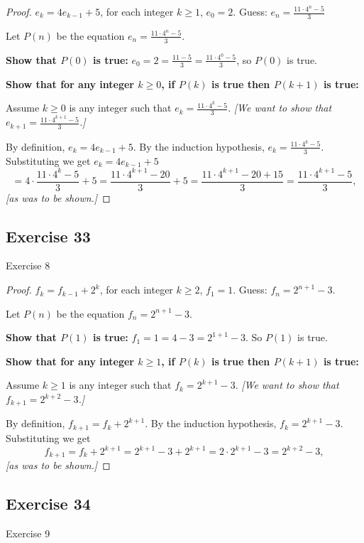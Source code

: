 \documentclass[14pt]{extarticle}
\newcommand{\dps}{\displaystyle}
\begin{document}
\begin{proof}
\(e_k = 4e_{k-1} + 5\), for each integer \(k \geq 1\), \(e_0 = 2\). 
Guess: \(\dps e_n = \frac{11 \cdot 4^n - 5}{3}\)

Let $P(n)$ be the equation \(\dps e_n = \frac{11 \cdot 4^n - 5}{3}\).

{\bf Show that \(P(0)\) is true:} \(e_0 = 2 = \frac{11 - 5}{3} = \frac{11 \cdot 4^0 - 5}{3}\), so $P(0)$ is true.

{\bf Show that for any integer \(k \geq 0\), if \(P(k)\) is true then \(P(k+1)\) is true:}

Assume \(k \geq 0\) is any integer such that \(\dps e_k = \frac{11 \cdot 4^k - 5}{3}\). 
{\it [We want to show that \(\dps e_{k+1} = \frac{11 \cdot 4^{k+1} - 5}{3}\).]}

By definition, \(e_k = 4e_{k-1} + 5\).
By the induction hypothesis, \(\dps e_k = \frac{11 \cdot 4^k - 5}{3}\).
Substituting we get \(e_k = 4e_{k-1} + 5\)
\[
= 4 \cdot \frac{11 \cdot 4^k - 5}{3} + 5 = \frac{11 \cdot 4^{k+1} - 20}{3} + 5 = 
\frac{11 \cdot 4^{k+1} - 20 + 15}{3} = \frac{11 \cdot 4^{k+1} - 5}{3},
\]
{\it [as was to be shown.]}
\end{proof}

\subsection{Exercise 33}
Exercise 8

\begin{proof}
\(f_k = f_{k-1} + 2^k\), for each integer \(k \geq 2\), \(f_1 = 1\). Guess: \(f_n = 2^{n+1} - 3\).

Let $P(n)$ be the equation \(f_n = 2^{n+1} - 3\).

{\bf Show that \(P(1)\) is true:} \(f_1 = 1 = 4 - 3 = 2^{1+1} - 3\). So $P(1)$ is true.

{\bf Show that for any integer \(k \geq 1\), if \(P(k)\) is true then \(P(k+1)\) is true:}

Assume \(k \geq 1\) is any integer such that \(f_k = 2^{k+1} - 3\). 
{\it [We want to show that \(f_{k+1} = 2^{k+2} - 3\).]}

By definition, \(f_{k+1} = f_k + 2^{k+1}\).
By the induction hypothesis, \(f_k = 2^{k+1} - 3\).
Substituting we get
\[
f_{k+1} = f_k + 2^{k+1} = 2^{k+1} - 3 + 2^{k+1} = 2 \cdot 2^{k+1} - 3 = 2^{k+2} - 3,
\]
{\it [as was to be shown.]}
\end{proof}

\subsection{Exercise 34}
Exercise 9
\end{document}
